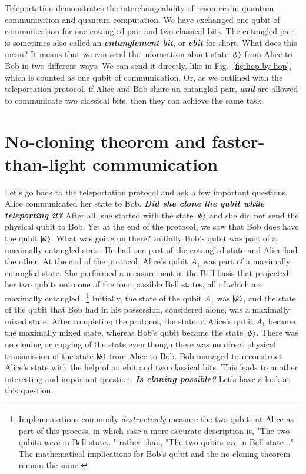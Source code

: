 Teleportation demonstrates the interchangeability of resources in quantum communication and quantum computation.
We have exchanged one qubit of communication for one entangled pair and two classical bits.
The entangled pair is sometimes also called an \textbf{\emph{entanglement bit}}, or \textbf{\emph{ebit}} for short.
What does this mean?
It means that we can send the information about state $\left| \psi \right\rangle$ from Alice to Bob in two different ways.
We can send it directly, like in Fig.~\ref{fig:hop-by-hop}, which is counted as one qubit of communication.
Or, as we outlined with the teleportation protocol, if Alice and Bob share an entangled pair, \textbf{\emph{and}} are allowed to communicate two classical bits, then they can achieve the same task.



\section{No-cloning theorem and faster-than-light communication}
\label{sec:8-3_no-cloning}

Let's go back to the teleportation protocol and ask a few important questions.
Alice communicated her state to Bob.
\textbf{\emph{Did she clone the qubit while teleporting it?}}
After all, she started with the state $\left| \psi \right\rangle$ and she did not send the physical qubit to Bob.
Yet at the end of the protocol, we saw that Bob does have the qubit $\left| \psi \right\rangle$.
What was going on there?
Initially Bob's qubit was part of a maximally entangled state.
He had one part of the entangled state and Alice had the other.
At the end of the protocol, Alice's qubit $A_1$ was part of a maximally entangled state.
She performed a measurement in the Bell basis that projected her two qubits onto one of the four possible Bell states, all of which are maximally entangled.~\footnote{Implementations commonly \emph{destructively} measure the two qubits at Alice as part of this process, in which case a more accurate description is, "The two qubits \emph{were} in Bell state..." rather than, "The two qubits \emph{are} in Bell state..." The mathematical implications for Bob's qubit and the no-cloning theorem remain the same.}
Initially, the state of the qubit $A_1$ was $\left| \psi \right\rangle$, and the state of the qubit that Bob had in his possession, considered alone, was a maximally mixed state.
After completing the protocol, the state of Alice's qubit $A_1$ became the maximally mixed state, whereas Bob's qubit became the state $\left| \psi \right\rangle$.
There was no cloning or copying of the state even though there was no direct physical transmission of the state $\left| \psi \right\rangle$ from Alice to Bob.
Bob managed to reconstruct Alice's state with the help of an ebit and two classical bits.
This leads to another interesting and important question.
\textbf{\emph{Is cloning possible?}}
Let's have a look at this question.

